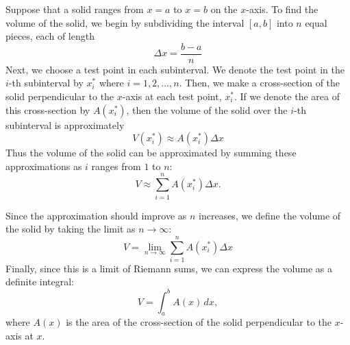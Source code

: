 \documentclass{ximera}
\begin{document}
Suppose that a solid ranges from $x=a$ to $x = b$ on the $x$-axis.
To find the volume of the solid, we begin by subdividing the interval $[a,b]$ into $n$ equal pieces, each of length
\[
\Delta x = \frac{b-a}{n}
\]
Next, we choose a test point in each subinterval. We denote the test point in the $i$-th subinterval by $x_i^*$ where $i = 1, 2, \dots , n$.
Then, we make a cross-section of the solid perpendicular to the $x$-axis at each test point, $x_i^*$. If we denote the area of this cross-section by $A(x_i^*)$,
then the volume of the solid over the $i$-th subinterval is approximately 
\[
V(x_i^*) \approx A(x_i^*) \Delta x
\]
Thus the volume of the solid can be approximated by summing these approximations as $i$ ranges from $1$ to $n$:
\[
V \approx \sum_{i=1}^n A(x_i^*) \Delta x.
\]

Since the approximation should improve as $n$ increases, we define the volume of the solid by taking the limit as $n \to \infty$:
\[
V = \lim_{n \to \infty} \sum_{i=1}^n A(x_i^*) \Delta x
\]
Finally, since this is a limit of Riemann sums, we can express the volume as a definite integral:
\[
V = \int_a^b A(x) \, dx,
\]
where $A(x)$ is the area of the cross-section of the solid perpendicular to the $x$-axis at $x$.
\end{document}
